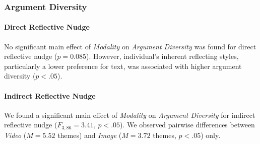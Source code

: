 
\subsubsection{Argument Diversity}

\paragraph{Direct Reflective Nudge} No significant main effect of \emph{Modality} on \emph{Argument Diversity} was found for direct reflective nudge ($p=0.085$). However, individual's inherent reflecting styles, particularly a lower preference for text, was associated with higher argument diversity ($p<.05$). %

\paragraph{Indirect Reflective Nudge} We found a significant main effect of \emph{Modality} on \emph{Argument Diversity} for indirect reflective nudge ($F_{3,86} = 3.41$, $p<.05$). We observed pairwise differences between \emph{Video} ($M = 5.52$ themes) and \emph{Image} ($M = 3.72$ themes, $p<.05$) only.


